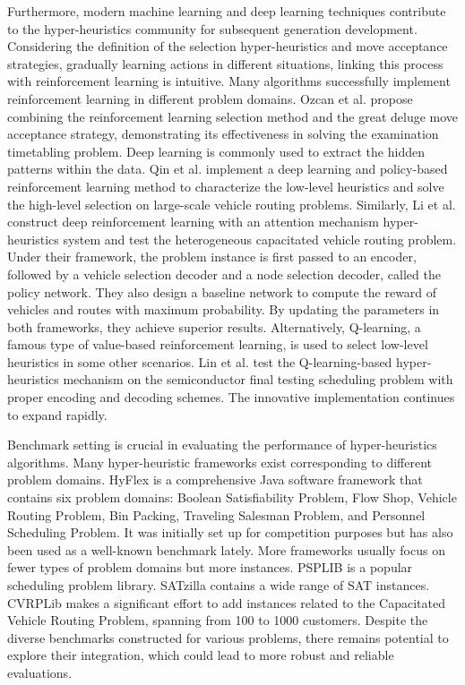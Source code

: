 \documentclass[preprint,review,12pt]{elsarticle}
\begin{document}
Furthermore, modern machine learning and deep learning techniques contribute to the hyper-heuristics community for subsequent generation development. Considering the definition of the selection hyper-heuristics and move acceptance strategies, gradually learning actions in different situations, linking this process with reinforcement learning is intuitive. Many algorithms successfully implement reinforcement learning in different problem domains. Ozcan et al.\cite{ozcan2012reinforcement} propose combining the reinforcement learning selection method and the great deluge move acceptance strategy, demonstrating its effectiveness in solving the examination timetabling problem. Deep learning is commonly used to extract the hidden patterns within the data. Qin et al.\cite{qin2021novel} implement a deep learning and policy-based reinforcement learning method to characterize the low-level heuristics and solve the high-level selection on large-scale vehicle routing problems. Similarly, Li et al.\cite{li2021deep} construct deep reinforcement learning with an attention mechanism hyper-heuristics system and test the heterogeneous capacitated vehicle routing problem. Under their framework, the problem instance is first passed to an encoder, followed by a vehicle selection decoder and a node selection decoder, called the policy network. They also design a baseline network to compute the reward of vehicles and routes with maximum probability. By updating the parameters in both frameworks, they achieve superior results. Alternatively, Q-learning, a famous type of value-based reinforcement learning, is used to select low-level heuristics in some other scenarios. Lin et al.\cite{lin2022semiconductor} test the Q-learning-based hyper-heuristics mechanism on the semiconductor final testing scheduling problem with proper encoding and decoding schemes. The innovative implementation continues to expand rapidly\cite{li2023generality}\cite{duflo2022framework}\cite{bao2023collaborative}\cite{gao2023ensemble}.

Benchmark setting is crucial in evaluating the performance of hyper-heuristics algorithms. Many hyper-heuristic frameworks exist corresponding to different problem domains. HyFlex\cite{ochoa2012hyflex} is a comprehensive Java software framework that contains six problem domains: Boolean Satisfiability Problem, Flow Shop, Vehicle Routing Problem, Bin Packing, Traveling Salesman Problem, and Personnel Scheduling Problem. It was initially set up for competition purposes but has also been used as a well-known benchmark lately. More frameworks usually focus on fewer types of problem domains but more instances. PSPLIB\cite{sprecher1996psplib} is a popular scheduling problem library. SATzilla\cite{xu2008satzilla} contains a wide range of SAT instances. CVRPLib\cite{uchoa2017new} makes a significant effort to add instances related to the Capacitated Vehicle Routing Problem, spanning from 100 to 1000 customers. Despite the diverse benchmarks constructed for various problems, there remains potential to explore their integration, which could lead to more robust and reliable evaluations. 
\end{document}
